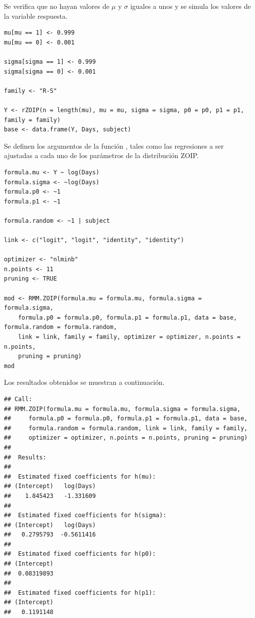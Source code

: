 Se verifica que no hayan valores de $\mu$ y $\sigma$ iguales a unos y se simula los valores de la variable respuesta.

\begin{verbatim}
mu[mu == 1] <- 0.999
mu[mu == 0] <- 0.001

sigma[sigma == 1] <- 0.999
sigma[sigma == 0] <- 0.001

family <- "R-S"

Y <- rZOIP(n = length(mu), mu = mu, sigma = sigma, p0 = p0, p1 = p1, family = family)
base <- data.frame(Y, Days, subject)
\end{verbatim}

Se definen los argumentos de la funci\'{o}n , tales como las regresiones a ser ajustadas a cada uno de los par\'{a}metros de la distribuci\'{o}n ZOIP.

\begin{verbatim}
formula.mu <- Y ~ log(Days)
formula.sigma <- ~log(Days)
formula.p0 <- ~1
formula.p1 <- ~1

formula.random <- ~1 | subject

link <- c("logit", "logit", "identity", "identity")

optimizer <- "nlminb"
n.points <- 11
pruning <- TRUE

mod <- RMM.ZOIP(formula.mu = formula.mu, formula.sigma = formula.sigma, 
    formula.p0 = formula.p0, formula.p1 = formula.p1, data = base, formula.random = formula.random, 
    link = link, family = family, optimizer = optimizer, n.points = n.points, 
    pruning = pruning)
mod
\end{verbatim}

Los resultados obtenidos se muestran a continuaci\'{o}n.

\begin{verbatim}
## Call:
## RMM.ZOIP(formula.mu = formula.mu, formula.sigma = formula.sigma, 
##     formula.p0 = formula.p0, formula.p1 = formula.p1, data = base, 
##     formula.random = formula.random, link = link, family = family, 
##     optimizer = optimizer, n.points = n.points, pruning = pruning)
## 
##  Results: 
## 
##  Estimated fixed coefficients for h(mu): 
## (Intercept)   log(Days) 
##    1.845423   -1.331609 
## 
##  Estimated fixed coefficients for h(sigma): 
## (Intercept)   log(Days) 
##   0.2795793  -0.5611416 
## 
##  Estimated fixed coefficients for h(p0): 
## (Intercept) 
##  0.08319893 
## 
##  Estimated fixed coefficients for h(p1): 
## (Intercept) 
##   0.1191148 
\end{verbatim}

